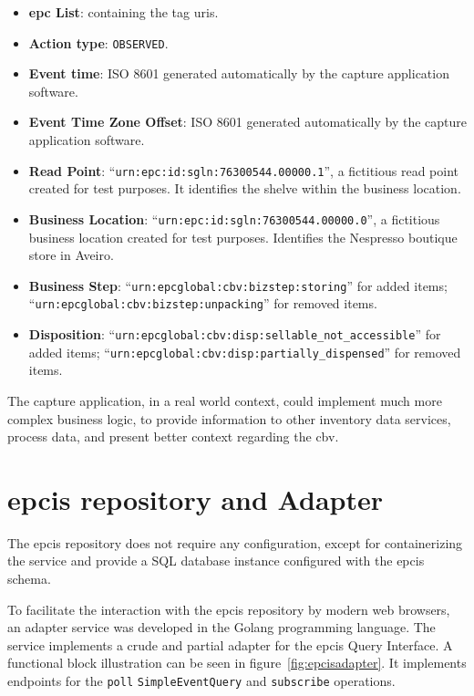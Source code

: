 \begin{itemize}
  \item \textbf{\ac{epc} List}: containing the tag \acp{uri}.
  \item \textbf{Action type}: \texttt{OBSERVED}.
  \item \textbf{Event time}: ISO 8601 generated automatically by the capture application software.
  \item \textbf{Event Time Zone Offset}: ISO 8601 generated automatically by the capture application software.
  \item \textbf{Read Point}: ``\texttt{urn:epc:id:sgln:76300544.00000.1}'', a fictitious read point created for test purposes. It identifies the shelve within the business location.
  \item \textbf{Business Location}: ``\texttt{urn:epc:id:sgln:76300544.00000.0}'', a fictitious business location created for test purposes. Identifies the Nespresso boutique store in Aveiro. 
  \item \textbf{Business Step}: ``\texttt{urn:epcglobal:cbv:bizstep:storing}'' for added items; ``\texttt{urn:epcglobal:cbv:bizstep:unpacking}'' for removed items. 
  \item \textbf{Disposition}: ``\texttt{urn:epcglobal:cbv:disp:sellable\_not\_accessible}'' for added items; ``\texttt{urn:epcglobal:cbv:disp:partially\_dispensed}'' for removed items.
\end{itemize}

The capture application, in a real world context, could implement much more complex business logic, to provide information to other inventory data services, process data, and present better context regarding the \ac{cbv}. 

\section{\acs{epcis} repository and Adapter}

The \ac{epcis} repository does not require any configuration, except for containerizing the service and provide a SQL database instance configured with the \ac{epcis} schema.

To facilitate the interaction with the \ac{epcis} repository by modern web browsers, an adapter service was developed in the Golang programming language. The service implements a crude and partial adapter for the \ac{epcis} Query Interface. A functional block illustration can be seen in figure~\ref{fig:epcisadapter}. It implements endpoints for the \texttt{poll} \texttt{SimpleEventQuery} and \texttt{subscribe} operations.

